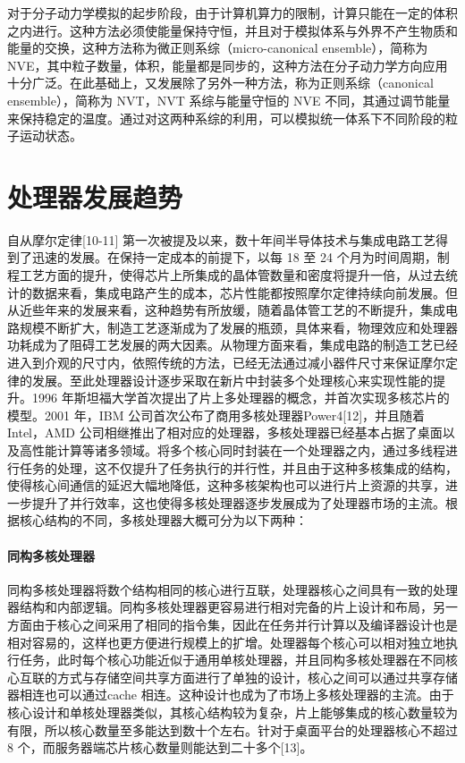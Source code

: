 对于分子动力学模拟的起步阶段，由于计算机算力的限制，计算只能在一定的体积之内进行。这种方法必须使能量保持守恒，并且对于模拟体系与外界不产生物质和能量的交换，这种方法称为微正则系综（micro-canonical ensemble），简称为NVE，其中粒子数量，体积，能量都是同步的，这种方法在分子动力学方向应用十分广泛。在此基础上，又发展除了另外一种方法，称为正则系综（canonical ensemble），简称为 NVT，NVT 系综与能量守恒的 NVE 不同，其通过调节能量来保持稳定的温度。通过对这两种系综的利用，可以模拟统一体系下不同阶段的粒子运动状态。

\section{处理器发展趋势}
自从摩尔定律[10-11] 第一次被提及以来，数十年间半导体技术与集成电路工艺得到了迅速的发展。在保持一定成本的前提下，以每 18 至 24 个月为时间周期，制程工艺方面的提升，使得芯片上所集成的晶体管数量和密度将提升一倍，从过去统计的数据来看，集成电路产生的成本，芯片性能都按照摩尔定律持续向前发展。但从近些年来的发展来看，这种趋势有所放缓，随着晶体管工艺的不断提升，集成电路规模不断扩大，制造工艺逐渐成为了发展的瓶颈，具体来看，物理效应和处理器功耗成为了阻碍工艺发展的两大因素。从物理方面来看，集成电路的制造工艺已经进入到介观的尺寸内，依照传统的方法，已经无法通过减小器件尺寸来保证摩尔定律的发展。至此处理器设计逐步采取在新片中封装多个处理核心来实现性能的提升。1996 年斯坦福大学首次提出了片上多处理器的概念，并首次实现多核芯片的模型。2001 年，IBM 公司首次公布了商用多核处理器Power4[12]，并且随着Intel，AMD 公司相继推出了相对应的处理器，多核处理器已经基本占据了桌面以及高性能计算等诸多领域。将多个核心同时封装在一个处理器之内，通过多线程进行任务的处理，这不仅提升了任务执行的并行性，并且由于这种多核集成的结构，使得核心间通信的延迟大幅地降低，这种多核架构也可以进行片上资源的共享，进一步提升了并行效率，这也使得多核处理器逐步发展成为了处理器市场的主流。根据核心结构的不同，多核处理器大概可分为以下两种：

\paragraph{同构多核处理器}
同构多核处理器将数个结构相同的核心进行互联，处理器核心之间具有一致的处理器结构和内部逻辑。同构多核处理器更容易进行相对完备的片上设计和布局，另一方面由于核心之间采用了相同的指令集，因此在任务并行计算以及编译器设计也是相对容易的，这样也更方便进行规模上的扩增。处理器每个核心可以相对独立地执行任务，此时每个核心功能近似于通用单核处理器，并且同构多核处理器在不同核心互联的方式与存储空间共享方面进行了单独的设计，核心之间可以通过共享存储器相连也可以通过cache 相连。这种设计也成为了市场上多核处理器的主流。由于核心设计和单核处理器类似，其核心结构较为复杂，片上能够集成的核心数量较为有限，所以核心数量至多能达到数十个左右。针对于桌面平台的处理器核心不超过 8 个，而服务器端芯片核心数量则能达到二十多个[13]。
